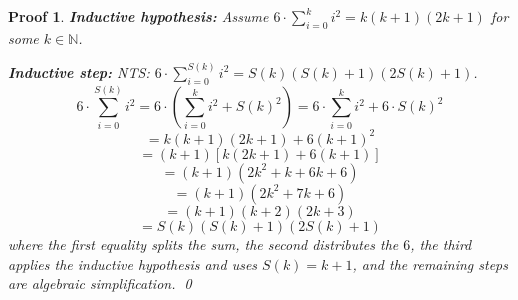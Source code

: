 \documentclass[12pt]{article}
\theoremstyle{proofstyle}
\newtheorem*{proof*}{Proof}
\begin{document}
\begin{enumerate}[left=0pt, itemsep=2em, parsep=1em]
\begin{proof*}
    \textbf{Inductive hypothesis:} Assume $6 \cdot \sum_{i=0}^{k} i^2 = k(k+1)(2k+1)$
    for some $k \in \mathbb{N}$.

    \textbf{Inductive step:} NTS: $6 \cdot \sum_{i=0}^{S(k)} i^2 = S(k)(S(k)+1)(2S(k)+1)$.
    \[
        6 \cdot \sum_{i=0}^{S(k)} i^2 = 6 \cdot \left(\sum_{i=0}^{k} i^2 + S(k)^2\right)
        = 6 \cdot \sum_{i=0}^{k} i^2 + 6 \cdot S(k)^2
    \]
    \[
        = k(k+1)(2k+1) + 6(k+1)^2
    \]
    \[
        = (k+1)\left[k(2k+1) + 6(k+1)\right]
    \]
    \[
        = (k+1)(2k^2 + k + 6k + 6)
    \]
    \[
        = (k+1)(2k^2 + 7k + 6)
    \]
    \[
        = (k+1)(k+2)(2k+3)
    \]
    \[
        = S(k)(S(k)+1)(2S(k)+1)
    \]
    where the first equality splits the sum, the second distributes the $6$,
    the third applies the inductive hypothesis and uses $S(k) = k+1$, and
    the remaining steps are algebraic simplification. \qed
\end{proof*}

\end{enumerate}
\end{document}
